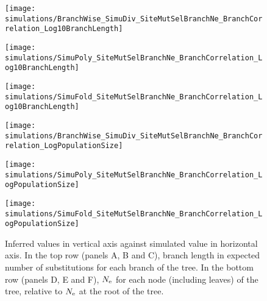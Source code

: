 \begin{figure}[htbp]
    \centering
    \begin{minipage}{0.32\linewidth}
        \texttt{[image: simulations/BranchWise\_SimuDiv\_SiteMutSelBranchNe\_BranchCorrelation\_Log10BranchLength]}
    \end{minipage}
    \hfill
    \begin{minipage}{0.32\linewidth}
        \texttt{[image: simulations/SimuPoly\_SiteMutSelBranchNe\_BranchCorrelation\_Log10BranchLength]}
    \end{minipage}
    \hfill
    \begin{minipage}{0.32\linewidth}
        \texttt{[image: simulations/SimuFold\_SiteMutSelBranchNe\_BranchCorrelation\_Log10BranchLength]}
    \end{minipage}
    \hfill
    \begin{minipage}{0.32\linewidth}
        \texttt{[image: simulations/BranchWise\_SimuDiv\_SiteMutSelBranchNe\_BranchCorrelation\_LogPopulationSize]}
    \end{minipage}
    \hfill
    \begin{minipage}{0.32\linewidth}
        \texttt{[image: simulations/SimuPoly\_SiteMutSelBranchNe\_BranchCorrelation\_LogPopulationSize]}
    \end{minipage}
    \hfill
    \begin{minipage}{0.32\linewidth}
        \texttt{[image: simulations/SimuFold\_SiteMutSelBranchNe\_BranchCorrelation\_LogPopulationSize]}
    \end{minipage}
    \hfill
    \caption[Inferred and simulated branch length and $\Ne$]{
    Inferred values in vertical axis against simulated value in horizontal axis.
    In the top row (panels A, B and C), branch length in expected number of substitutions for each branch of the tree.
    In the bottom row (panels D, E and F), $\Ne$ for each node (including leaves) of the tree, relative to $\Ne$ at the root of the tree.
}
\end{figure}
